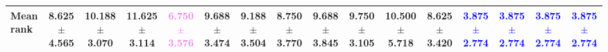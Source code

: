 \begin{table}[t!]
{\begin{tabular}{l|*{15}{c}}
\midrule
Mean rank & 8.625 $\pm$ 4.565 & 10.188 $\pm$ 3.070 & 11.625 $\pm$ 3.114 & \textbf{\textcolor{violet}{6.750 $\pm$ 3.576}} & 9.688 $\pm$ 3.474 & 9.188 $\pm$ 3.504 & 8.750 $\pm$ 3.770 & 9.688 $\pm$ 3.845 & 9.750 $\pm$ 3.105 & 10.500 $\pm$ 5.718 & 8.625 $\pm$ 3.420 & \textbf{\textcolor{blue}{3.875 $\pm$ 2.774}} & \textbf{\textcolor{blue}{3.875 $\pm$ 2.774}} & \textbf{\textcolor{blue}{3.875 $\pm$ 2.774}} & \textbf{\textcolor{blue}{3.875 $\pm$ 2.774}} \\
\bottomrule
\end{tabular}
}
\label{tab:gtg-duo-eval-m12}
\end{table}
